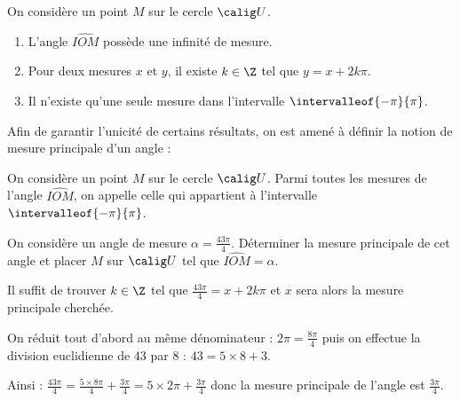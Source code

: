 \documentclass[10pt,openright,twoside,french]{book}
\begin{document}
\begin{Prop}
    On considère un point $M$ sur le cercle $\calig U$.
    \begin{enumerate}
        \item L'angle $\widehat{IOM}$ possède une infinité de mesure.
        \item Pour deux mesures $x$ et $y$, il existe $k \in \Z$ tel que $y = x + 2k\pi$.
        \item Il n'existe qu'une seule mesure dans l'intervalle $\intervalleof{-\pi}{\pi}$.
    \end{enumerate}
\end{Prop} \medskip

Afin de garantir l'unicité de certains résultats, on est amené à définir la notion de mesure principale d'un angle :

\begin{Defi}
    On considère un point $M$ sur le cercle $\calig U$.
    Parmi toutes les mesures de l'angle $\widehat{IOM}$, on appelle  celle qui appartient à l'intervalle $\intervalleof{-\pi}{\pi}$.
\end{Defi}\clearpage

\begin{Exemple}
    On considère un angle de mesure $\alpha = \frac{43\pi}{4}$. Déterminer la mesure principale de cet angle et placer $M$ sur $\calig U$ tel que $\widehat{IOM} = \alpha$.\par\medskip
    Il suffit de trouver $k \in \Z$ tel que $\frac{43\pi}{4} = x + 2k\pi$ et $x$ sera alors la mesure principale cherchée.\par
    On réduit tout d'abord au même dénominateur : $2\pi = \frac{8\pi}{4}$ puis on effectue la division euclidienne de $43$ par $8$ : $43 =5\times 8 + 3$.\par\medskip
    Ainsi : $\frac{43\pi}{4} = \frac{5 \times 8\pi}{4} + \frac{3\pi}{4} = 5 \times 2\pi + \frac{3\pi}{4}$ donc la mesure principale de l'angle est $\frac{3\pi}{4}$.

\begin{center}
    \end{center}
\end{Exemple}
\end{document}
